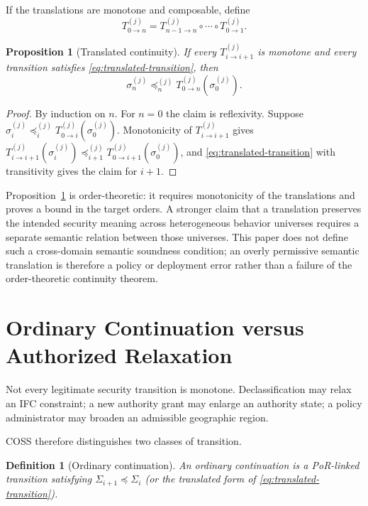 \documentclass[10pt,twocolumn]{article}
\newcommand{\Model}{\textnormal{\textsc{COSS}}\xspace}
\newcommand{\state}{\Sigma}
\newcommand{\coord}{\sigma}
\newtheorem{definition}{Definition}
\newtheorem{proposition}{Proposition}
\begin{document}
If the translations are monotone and composable, define
\begin{equation}
  T_{0\rightarrow n}^{(j)}
  =T_{n-1\rightarrow n}^{(j)}\circ\cdots\circ T_{0\rightarrow1}^{(j)}.
\end{equation}

\begin{proposition}[Translated continuity]\label{prop:translated}
If every $T^{(j)}_{i\rightarrow i+1}$ is monotone and every transition
satisfies \eqref{eq:translated-transition}, then
\begin{equation}
  \coord_n^{(j)}\preceq_n^{(j)}T_{0\rightarrow n}^{(j)}(\coord_0^{(j)}).
\end{equation}
\end{proposition}

\begin{proof}
By induction on $n$. For $n=0$ the claim is reflexivity. Suppose
$\coord_i^{(j)}\preceq_i^{(j)}T_{0\rightarrow i}^{(j)}(\coord_0^{(j)})$.
Monotonicity of $T^{(j)}_{i\rightarrow i+1}$ gives
$T^{(j)}_{i\rightarrow i+1}(\coord_i^{(j)})\preceq_{i+1}^{(j)}
T_{0\rightarrow i+1}^{(j)}(\coord_0^{(j)})$, and
\eqref{eq:translated-transition} with transitivity gives the claim for
$i+1$.
\end{proof}

Proposition~\ref{prop:translated} is order-theoretic: it requires monotonicity
of the translations and proves a bound in the target orders. A stronger claim
that a translation preserves the intended security meaning across heterogeneous
behavior universes requires a separate semantic relation between those
universes. This paper does not define such a cross-domain semantic soundness
condition; an overly permissive semantic translation is therefore a policy or
deployment error rather than a failure of the order-theoretic continuity
theorem.


\section{Ordinary Continuation versus Authorized Relaxation}
\label{sec:relaxation}

Not every legitimate security transition is monotone.  Declassification may
relax an IFC constraint; a new authority grant may enlarge an authority state;
a policy administrator may broaden an admissible geographic region.

\Model therefore distinguishes two classes of transition.

\begin{definition}[Ordinary continuation]
An ordinary continuation is a PoR-linked transition satisfying
$\state_{i+1}\preceq\state_i$ (or the translated form of
\eqref{eq:translated-transition}).
\end{definition}
\end{document}
